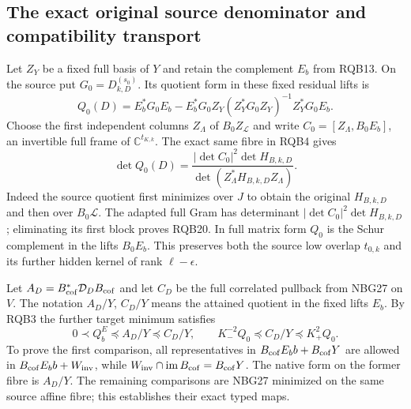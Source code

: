\documentclass[10pt]{article}
\begin{document}
\subsection{The exact original source denominator and compatibility transport}

Let $Z_Y$ be a fixed full basis of $Y$ and retain the complement
$E_b$ from RQB13. On the source put $G_0=D_{k,D}^{(s_0)}$.
Its quotient form in these fixed residual lifts is
\[
 Q_0(D)=E_b^*G_0E_b
 -E_b^*G_0Z_Y(Z_Y^*G_0Z_Y)^{-1}Z_Y^*G_0E_b .
 \tag{RQB19}
\]
Choose the first independent columns $Z_\Lambda$ of
$B_0Z_{\mathscr L}$ and write
$C_0=[Z_\Lambda,B_0E_b]$, an invertible full frame of
$\mathbb C^{t_{K,k}}$. The exact same fibre in RQB4 gives
\[
 \det Q_0(D)=
 \frac{|\det C_0|^2\det H_{B,k,D}}
      {\det(Z_\Lambda^*H_{B,k,D}Z_\Lambda)} .
 \tag{RQB20}
\]
Indeed the source quotient first minimizes over $J$ to obtain
the original $H_{B,k,D}$ and then over $B_0\mathscr L$.
The adapted full Gram has determinant
$|\det C_0|^2\det H_{B,k,D}$; eliminating its first block proves
RQB20. In full matrix form $Q_0$ is the Schur complement in the
lifts $B_0E_b$. This preserves both the source low overlap
$t_{0,k}$ and its further hidden kernel of rank $\ell-\epsilon$.

Let $A_D=B_{\rm cof}^*\mathcal D_D B_{\rm cof}$ and let $C_D$
be the full correlated pullback from NBG27 on $V$.
The notation $A_D/Y$, $C_D/Y$ means the attained quotient in
the fixed lifts $E_b$. By RQB3 the further target minimum
satisfies
\[
 0\prec Q_b^E\preceq A_D/Y\preceq C_D/Y,\qquad
 K_-^{-2}Q_0\preceq C_D/Y\preceq K_+^2Q_0 .
 \tag{RQB21}
\]
To prove the first comparison, all representatives in
$B_{\rm cof}E_bb+B_{\rm cof}Y$ are allowed in
$B_{\rm cof}E_bb+W_{\rm inv}$, while
$W_{\rm inv}\cap\operatorname{im}B_{\rm cof}=B_{\rm cof}Y$.
The native form on the former fibre is $A_D/Y$.
The remaining comparisons are NBG27 minimized on the same
source affine fibre; this establishes their exact typed maps.
\end{document}

